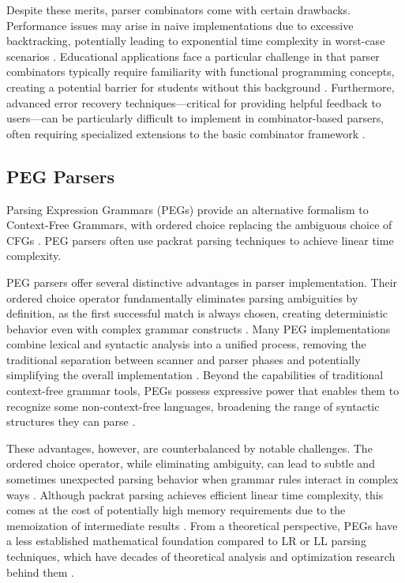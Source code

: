 Despite these merits, parser combinators come with certain drawbacks. Performance issues may arise in naive implementations due to excessive backtracking, potentially leading to exponential time complexity in worst-case scenarios \cite{leijen2001parsec}. Educational applications face a particular challenge in that parser combinators typically require familiarity with functional programming concepts, creating a potential barrier for students without this background \cite{sestoft2017programming}. Furthermore, advanced error recovery techniques—critical for providing helpful feedback to users—can be particularly difficult to implement in combinator-based parsers, often requiring specialized extensions to the basic combinator framework \cite{tratt2010parsing}.

\subsection{PEG Parsers}

Parsing Expression Grammars (PEGs) provide an alternative formalism to Context-Free Grammars, with ordered choice replacing the ambiguous choice of CFGs \cite{ford2004parsing}. PEG parsers often use packrat parsing techniques to achieve linear time complexity.

PEG parsers offer several distinctive advantages in parser implementation. Their ordered choice operator fundamentally eliminates parsing ambiguities by definition, as the first successful match is always chosen, creating deterministic behavior even with complex grammar constructs \cite{ford2004parsing}. Many PEG implementations combine lexical and syntactic analysis into a unified process, removing the traditional separation between scanner and parser phases and potentially simplifying the overall implementation \cite{grimm2006better}. Beyond the capabilities of traditional context-free grammar tools, PEGs possess expressive power that enables them to recognize some non-context-free languages, broadening the range of syntactic structures they can parse \cite{medeiros2014peg}.

These advantages, however, are counterbalanced by notable challenges. The ordered choice operator, while eliminating ambiguity, can lead to subtle and sometimes unexpected parsing behavior when grammar rules interact in complex ways \cite{tratt2010parsing}. Although packrat parsing achieves efficient linear time complexity, this comes at the cost of potentially high memory requirements due to the memoization of intermediate results \cite{ford2002packrat}. From a theoretical perspective, PEGs have a less established mathematical foundation compared to LR or LL parsing techniques, which have decades of theoretical analysis and optimization research behind them \cite{medeiros2014peg}.

